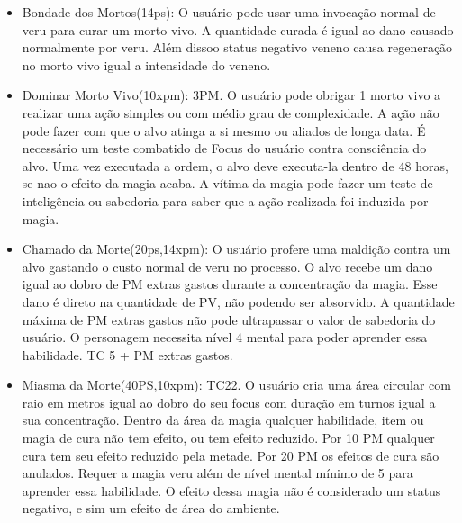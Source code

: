 \begin{itemize}
	\item Bondade dos Mortos(14ps): O usuário pode usar uma invocação normal de veru para curar um morto vivo. A quantidade curada é igual ao dano causado normalmente por veru. Além dissoo status negativo veneno causa regeneração no morto vivo igual a intensidade do veneno.

	\item Dominar Morto Vivo(10xpm): 3PM.\newline
O usuário pode obrigar 1 morto vivo a realizar uma ação simples ou com médio grau de complexidade. A ação não pode fazer com que o alvo atinga a si mesmo ou aliados de longa data. É necessário um teste combatido de Focus do usuário contra consciência do alvo. Uma vez executada a ordem, o alvo deve executa-la dentro de 48 horas, se nao o efeito da magia acaba. A vítima da magia pode fazer um teste de inteligência ou sabedoria para saber que a ação realizada foi induzida por magia.
	
	\item Chamado da Morte(20ps,14xpm): O usuário profere uma maldição contra um alvo gastando o custo normal de veru no processo. O alvo recebe um dano igual ao dobro de PM extras gastos durante a concentração da magia. Esse dano é direto na quantidade de PV, não podendo ser absorvido. A quantidade máxima de PM extras gastos não pode ultrapassar o valor de sabedoria do usuário. O personagem necessita nível 4 mental para poder aprender essa habilidade. TC 5 + PM extras gastos.



  	\item Miasma da Morte(40PS,10xpm): TC22.\newline
O usuário cria uma área circular com raio em metros igual ao dobro do seu focus com duração em turnos igual a sua concentração. Dentro da área da magia qualquer habilidade, item ou magia de cura não tem efeito, ou tem efeito reduzido. Por 10 PM qualquer cura tem seu efeito reduzido pela metade. Por 20 PM os efeitos de cura são anulados. Requer a magia veru além de nível mental mínimo de 5 para aprender essa habilidade. O efeito dessa magia não é considerado um status negativo, e sim um efeito de área do ambiente. 
	
\end{itemize}


